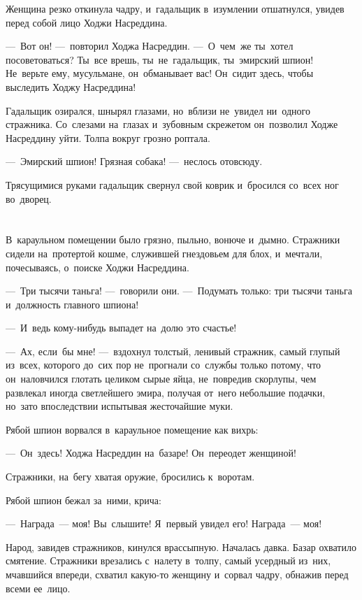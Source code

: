 \documentclass[12pt,a4paper]{book}
\begin{document}
Женщина резко откинула чадру, и~гадальщик в~изумлении отшатнулся, увидев перед собой лицо Ходжи Насреддина.

—~Вот он! —~повторил Ходжа Насреддин. —~О~чем~же ты~хотел посоветоваться? Ты~все врешь, ты~не~гадальщик, ты~эмирский шпион! Не~верьте ему, мусульмане, он~обманывает вас! Он~сидит здесь, чтобы выследить Ходжу Насреддина!

Гадальщик озирался, шнырял глазами, но~вблизи не~увидел ни~одного стражника. Со~слезами на~глазах и~зубовным скрежетом он~позволил Ходже Насреддину уйти. Толпа вокруг грозно роптала.

—~Эмирский шпион! Грязная собака! —~неслось отовсюду.

Трясущимися руками гадальщик свернул свой коврик и~бросился со~всех ног во~дворец.


\chapter{}

В~караульном помещении было грязно, пыльно, вонюче и~дымно. Стражники сидели на~протертой кошме, служившей гнездовьем для блох, и~мечтали, почесываясь, о~поиске Ходжи Насреддина.

—~Три тысячи таньга! —~говорили они. —~Подумать только: три тысячи таньга и~должность главного шпиона!

—~И~ведь кому-нибудь выпадет на~долю это счастье!

—~Ах, если~бы мне! —~вздохнул толстый, ленивый стражник, самый глупый из~всех, которого до~сих пор не~прогнали со~службы только потому, что он~наловчился глотать целиком сырые яйца, не~повредив скорлупы, чем развлекал иногда светлейшего эмира, получая от~него небольшие подачки, но~зато впоследствии испытывая жесточайшие муки.

Рябой шпион ворвался в~караульное помещение как вихрь:

—~Он~здесь! Ходжа Насреддин на~базаре! Он~переодет женщиной!

Стражники, на~бегу хватая оружие, бросились к~воротам.

Рябой шпион бежал за~ними, крича:

—~Награда~— моя! Вы~слышите! Я~первый увидел его! Награда~— моя!

Народ, завидев стражников, кинулся врассыпную. Началась давка. Базар охватило смятение. Стражники врезались с~налету в~толпу, самый усердный из~них, мчавшийся впереди, схватил какую-то женщину и~сорвал чадру, обнажив перед всеми ее~лицо.
\end{document}
